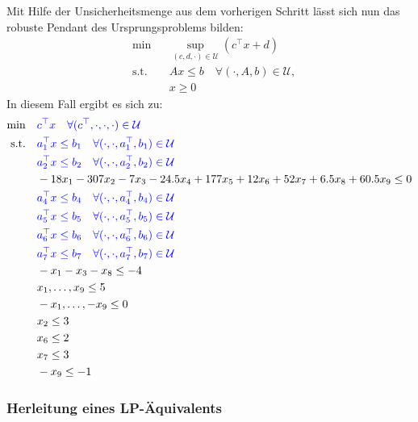 \documentclass[a4paper,12pt]{article}
\begin{document}
Mit Hilfe der Unsicherheitsmenge aus dem vorherigen Schritt l\"asst sich nun das robuste Pendant des Ursprungsproblems bilden:
\[
\begin{aligned}
    &\min && \sup_{(c, d, \cdot) \in \mathcal{U}} \left(c^\top x + d\right) \\
    &\text{s.t.} && Ax \leq b \quad \forall (\cdot, A, b) \in \mathcal{U}, \\
    & && x \geq 0
\end{aligned}
\]
In diesem Fall ergibt es sich zu:
\[
\begin{aligned}
   \begin{aligned}
    \min & \quad \textcolor{blue}{c^\top x \quad \forall (c^\top, \cdot,\cdot,\cdot) \in \mathcal{U}} \\ %
    \text{s.t.} & \quad \textcolor{blue}{a_1^\top x \leq b_1 \quad \forall (\cdot, \cdot, a_1^\top, b_1) \in \mathcal{U}} \\
    & \quad \textcolor{blue}{a_2^\top x \leq b_2 \quad \forall (\cdot, \cdot, a_2^\top, b_2) \in \mathcal{U}} \\
    & \quad -18x_1 - 307x_2 - 7x_3 - 24.5x_4 + 177x_5 + 12x_6 + 52x_7 + 6.5x_8 + 60.5x_9 \leq 0 \\
    & \quad \textcolor{blue}{a_4^\top x \leq b_4 \quad \forall (\cdot, \cdot, a_4^\top, b_4) \in \mathcal{U}} \\
    & \quad \textcolor{blue}{a_5^\top x \leq b_5 \quad \forall (\cdot, \cdot, a_5^\top, b_5) \in \mathcal{U}} \\
    & \quad \textcolor{blue}{a_6^\top x \leq b_6 \quad \forall (\cdot, \cdot, a_6^\top, b_6) \in \mathcal{U}} \\
    & \quad \textcolor{blue}{a_7^\top x \leq b_7 \quad \forall (\cdot, \cdot, a_7^\top, b_7) \in \mathcal{U}}\\
    & \quad -x_1 - x_3 - x_8 \leq -4 \\
    & \quad x_1, \dots, x_9 \leq 5 \\
    & \quad - x_1, \dots, - x_9 \leq 0 \\
    & \quad x_2 \leq 3 \\
    & \quad x_6 \leq 2 \\
    & \quad x_7 \leq 3 \\
    & \quad - x_9 \leq - 1
\end{aligned}
\end{aligned}
\]

\subsubsection*{Herleitung eines LP-\"Aquivalents}
\end{document}
